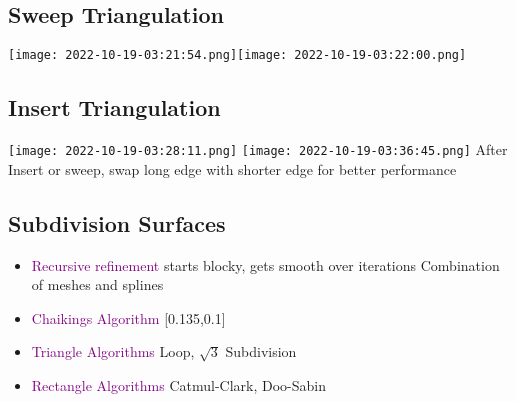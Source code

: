 \documentclass[main.tex,fontsize=12pt,paper=a4,paper=landscape,DIV=calc,]{scrartcl}
\begin{document}
\begin{multicols*}{4}
\subsection{Sweep Triangulation}
\texttt{[image: 2022-10-19-03:21:54.png]}\texttt{[image: 2022-10-19-03:22:00.png]}\newline

\subsection{Insert Triangulation}
\texttt{[image: 2022-10-19-03:28:11.png]}
\texttt{[image: 2022-10-19-03:36:45.png]}\newline
After Insert or sweep, swap long edge with shorter edge for better performance\newline

\subsection{Subdivision Surfaces}
\begin{itemize}
\item \textcolor{purple}{Recursive refinement}\newline
starts blocky, gets smooth over iterations\newline
\textcolor{OliveGreen}{Combination of meshes and splines}
\item \textcolor{purple}{Chaikings Algorithm}\newline
{}[0.135,0.1]
\item \textcolor{purple}{Triangle Algorithms}\newline
  Loop, \(\sqrt{3}\) Subdivision
\item \textcolor{purple}{Rectangle Algorithms}\newline
  Catmul-Clark, Doo-Sabin
\end{itemize}


\end{multicols*}
\end{document}
